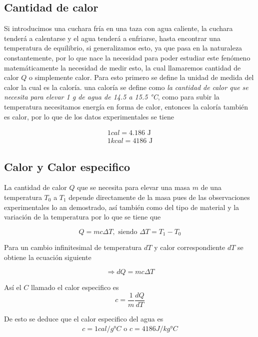\subsection{Cantidad de calor}
Si introducimos una cuchara fría en una taza
con agua caliente, la cuchara tenderá a  calentarse
y el agua tenderá a enfriarse, hasta encontrar
una temperatura de equilibrio, si generalizamos esto,
ya que pasa en la naturaleza constantemente, por lo que nace
la necesidad para poder estudiar este  fenómeno matemáticamente 
la necesidad de medir esto, la cual llamaremos
cantidad de calor $Q$ o simplemente calor. Para esto primero se define
la unidad de medida del calor la cual es la caloría.
una caloría se define como \textit{la cantidad de calor
que se necesita para elevar 1 g de agua de 14.5 a 15.5 °C}, 
como para subir la temperatura necesitamos energía en forma 
de calor, entonces la caloría también es calor, por lo que
de los datos experimentales se tiene

\begin{align*}
    1\unit{cal} = 4.186 \text{ J}\\
    1 \unit{kcal} = 4186 \text{ J}
\end{align*}

\subsection{Calor y Calor especifico}
La cantidad de calor $Q$ que se necesita para elevar una masa $m$
de una temperatura $T_0$ a $T_1$ depende directamente de la masa
pues de las observaciones experimentales lo an demostrado, 
así también como del tipo de material y la variación de la temperatura
por lo que se tiene que

\begin{equation}
    \label{eq:calor}
    Q = mc\Delta T, \text{ siendo } \Delta T = T_1 - T_0
\end{equation}

Para un cambio infinitesimal de temperatura $dT$ y calor
correspondiente $dT$ se obtiene la ecuación siguiente

\begin{equation}
    \Rightarrow dQ = mc\Delta T
\end{equation}

Así el $C$ llamado el calor especifico es
\begin{equation}
    c = \frac{1}{m}\frac{dQ}{dT}
\end{equation}

De esto se deduce que el calor especifico del
agua es
\begin{align*}
    c = 1 \unit{cal/g°C} \text{ o }    c = 4186 \unit{J/kg°C}
\end{align*}

